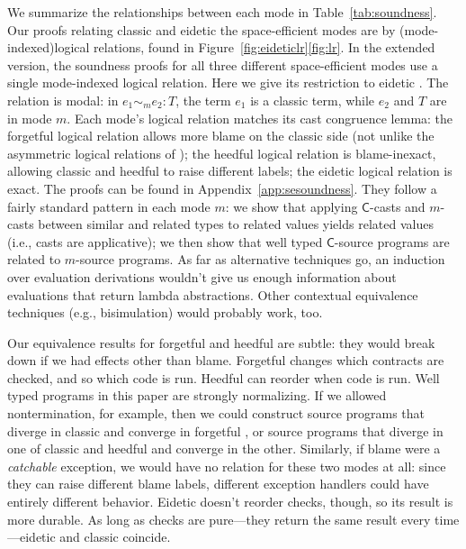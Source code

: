 \documentclass[9pt]{extarticle}
\newcommand{\reflr}{\ifpopl\ref{fig:eideticlr}\else\ref{fig:lr}\fi}
\newcommand{\ottnt}[1]{\mathit{#1}}
\begin{document}
{\iffull
We summarize the relationships between each mode in Table~\ref{tab:soundness}.
\fi}
Our proofs relating classic \lambdah and \ifpopl eidetic \lambdah \else the space-efficient modes \fi are
by \iffull(mode-indexed)\fi logical relations, found in
Figure~\reflr.
{\ifpopl
In the extended version, the soundness proofs for all three different
  space-efficient modes use a single mode-indexed logical relation. Here we give its restriction to eidetic \lambdah.
\else
The relation is modal: in $ \ottnt{e_{{\mathrm{1}}}}   \sim _{ \ottnt{m} }  \ottnt{e_{{\mathrm{2}}}}  :  \ottnt{T} $, the term $\ottnt{e_{{\mathrm{1}}}}$ is a
classic \lambdah term, while $\ottnt{e_{{\mathrm{2}}}}$ and $\ottnt{T}$ are in mode $\ottnt{m}$.
Each mode's logical relation matches its cast
congruence lemma: the forgetful logical relation allows more blame on
the classic side (not unlike the asymmetric logical relations of
\citet{Greenberg12contracts}); the heedful logical relation is
blame-inexact, allowing classic and heedful \lambdah to raise
different labels; the eidetic logical relation is exact.
The proofs can be found in Appendix~\ref{app:sesoundness}. They follow
a fairly standard pattern in each mode $\ottnt{m}$: we show that applying
$ \mathsf{C} $-casts and $\ottnt{m}$-casts between similar and related types to
related values yields related values (i.e., casts are applicative); we
then show that well typed $ \mathsf{C} $-source programs are related to
$\ottnt{m}$-source programs.
\fi}
As far as alternative techniques go, an induction over evaluation
derivations wouldn't give us enough information about evaluations that
return lambda abstractions. Other contextual equivalence
techniques (e.g., bisimulation) would probably work, too.

{\iffull
Our equivalence results for forgetful and heedful \lambdah are subtle:
they would break down if we had effects other than blame. Forgetful
\lambdah changes which contracts are checked, and so which code is
run. Heedful \lambdah can reorder when code is run. Well typed
\lambdah programs in this paper are strongly normalizing. If we
allowed nontermination, for example, then we could construct source
programs that diverge in classic \lambdah and converge in forgetful
\lambdah, or source programs that diverge in one of classic and
heedful \lambdah and converge in the other.
Similarly, if blame were a \textit{catchable} exception, we would have
no relation for these two modes at all: since they can raise different
blame labels, different exception handlers could have entirely
different behavior.
Eidetic \lambdah doesn't reorder checks, though, so its result is more
durable. As long as checks are pure---they return the same result
every time---eidetic and classic \lambdah coincide.
\fi}
\end{document}
